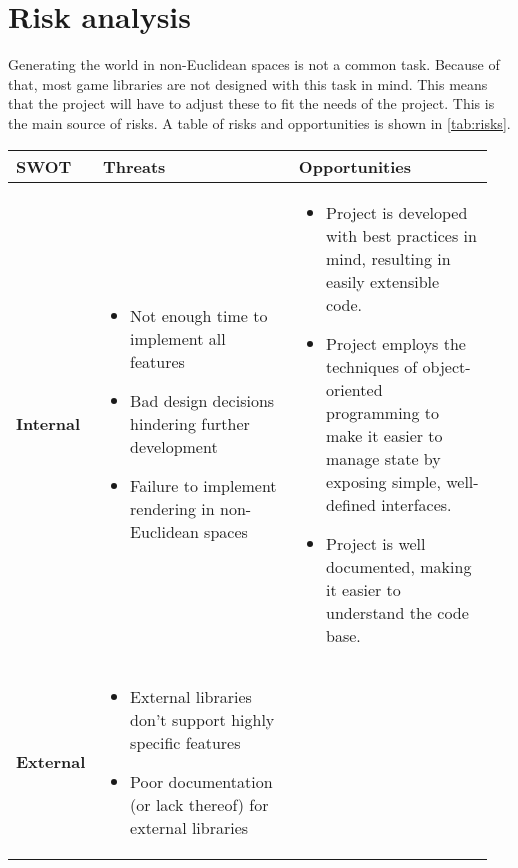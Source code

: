 \section{Risk analysis}
Generating the world in non-Euclidean spaces is not a common task.
Because of that, most game libraries are not designed with this task in mind.
This means that the project will have to adjust these to fit the needs of the project.
This is the main source of risks.
A table of risks and opportunities is shown in \autoref*{tab:risks}.

\begin{table}[H]
    \centering
    \begin{tabular}{|p{0.15\linewidth}|p{0.4\linewidth}|p{0.4\linewidth}|}
        \hline
        \textbf{SWOT} & \textbf{Threats}                                                                             & \textbf{Opportunities} \\ \hline
        \textbf{Internal}
                      & \begin{itemize}
                            \itemsep0em
                            \item Not enough time to implement all features
                            \item Bad design decisions hindering further development
                            \item Failure to implement rendering in non-Euclidean spaces
                        \end{itemize}
                      &
        \begin{itemize}
            \itemsep0em
            \item Project is developed with best practices in mind, resulting in easily extensible code.
            \item Project employs the techniques of object-oriented programming to make it easier to manage state by exposing simple, well-defined interfaces.
            \item Project is well documented, making it easier to understand the code base.
        \end{itemize}
        \\ \hline
        \textbf{External}
                      &
        \begin{itemize}
            \itemsep0em
            \item External libraries don't support highly specific features
            \item Poor documentation (or lack thereof) for external libraries

\end{itemize}
\end{tabular}
\end{table}
